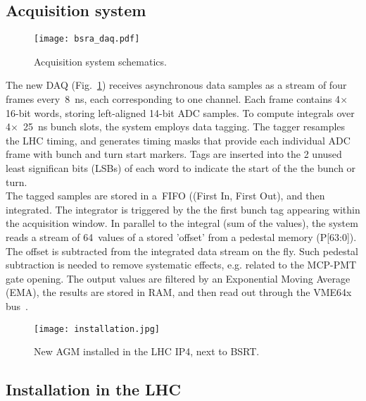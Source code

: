 \subsection{Acquisition system}
\begin{figure}[!tbh]
    \centering
    \texttt{[image: bsra\_daq.pdf]}
    \caption{Acquisition system schematics.}
    \label{fig:bsra_daq}
\end{figure}
%
The new DAQ (Fig.~\ref{fig:bsra_daq}) receives asynchronous data samples as a stream of four frames every~\SI{8}{\nano s}, each corresponding to one channel.
%
Each frame contains 4$\times$16-bit words, storing left-aligned 14-bit ADC samples. 
%
To compute integrals over 4$\times$~\SI{25}{\nano\second} bunch slots, the system employs data tagging. 
%
The tagger resamples the LHC timing, and generates timing masks that  provide each individual ADC frame with %
bunch and turn start markers. 
%
Tags are inserted into the  2 unused least significan bits (LSBs) of each word to indicate the start of the  the bunch or turn.
\\
%
The tagged samples are stored in a~FIFO ((First In, First Out), and then integrated. 
%
The integrator is triggered %
by the  the first bunch tag appearing within the acquisition window.
%
In parallel to the integral (sum of the values), the system reads a stream of 64~values of a stored 'offset' from a pedestal memory (P[63:0]).
%
The offset is subtracted  from the integrated data stream on the fly.
%
Such pedestal subtraction is needed to remove systematic effects, e.g. related to the  MCP-PMT gate opening. 
%
The output values are filtered by an Exponential Moving Average (EMA), the results are stored  in RAM, and then read out through the VME64x bus~\cite{my_thesis}.

\begin{figure}[!tbh]
    \centering
    \texttt{[image: installation.jpg]}
    \caption{New AGM installed in the LHC IP4, next to BSRT.}
    \label{fig:installation}
\end{figure}

\subsection{Installation in the LHC}

